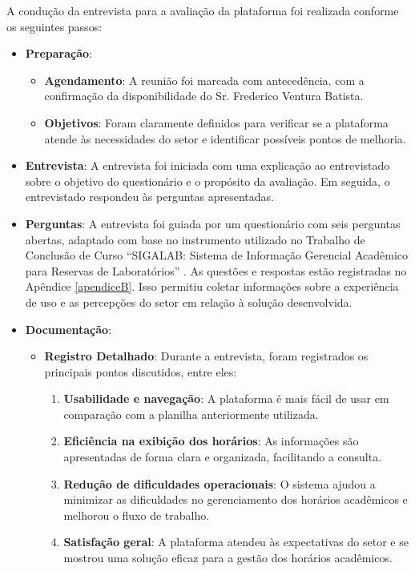 A condução da entrevista para a avaliação da plataforma foi realizada conforme os seguintes passos:
\begin{itemize}
    \item \textbf{Preparação}:
    \begin{itemize}
        \item \textbf{Agendamento}: A reunião foi marcada com antecedência, com a confirmação da disponibilidade do Sr. Frederico Ventura Batista.
        \item \textbf{Objetivos}: Foram claramente definidos para verificar se a plataforma atende às necessidades do setor e identificar possíveis pontos de melhoria.
    \end{itemize}
    \item \textbf{Entrevista}: A entrevista foi iniciada com uma explicação ao entrevistado sobre o objetivo do questionário e o propósito da avaliação. Em seguida, o entrevistado respondeu às perguntas apresentadas.
    \item \textbf{Perguntas}: A entrevista foi guiada por um questionário com seis perguntas abertas, adaptado com base no instrumento utilizado no Trabalho de Conclusão de Curso ``SIGALAB: Sistema de Informação Gerencial Acadêmico para Reservas de Laboratórios'' \cite{costa2018sigalab}. As questões e respostas estão registradas no Apêndice \ref{apendiceB}. Isso permitiu coletar informações sobre a experiência de uso e as percepções do setor em relação à solução desenvolvida.
    \item \textbf{Documentação}:
    \begin{itemize}
        \item \textbf{Registro Detalhado}: Durante a entrevista, foram registrados os principais pontos discutidos, entre eles:
        \begin{enumerate}
            \item \textbf{Usabilidade e navegação}: A plataforma é mais fácil de usar em comparação com a planilha anteriormente utilizada.
            \item \textbf{Eficiência na exibição dos horários}: As informações são apresentadas de forma clara e organizada, facilitando a consulta.
            \item \textbf{Redução de dificuldades operacionais}: O sistema ajudou a minimizar as dificuldades no gerenciamento dos horários acadêmicos e melhorou o fluxo de trabalho.
            \item \textbf{Satisfação geral}: A plataforma atendeu às expectativas do setor e se mostrou uma solução eficaz para a gestão dos horários acadêmicos.

\end{enumerate}
\end{itemize}
\end{itemize}

